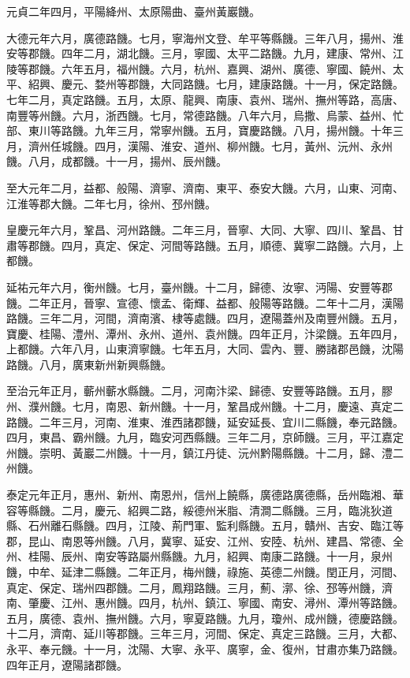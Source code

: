 \begin{pinyinscope}
 元貞二年四月，平陽絳州、太原陽曲、臺州黃巖饑。



 大德元年六月，廣德路饑。七月，寧海州文登、牟平等縣饑。三年八月，揚州、淮安等郡饑。四年二月，湖北饑。三月，寧國、太平二路饑。九月，建康、常州、江陵等郡饑。六年五月，福州饑。六月，杭州、嘉興、湖州、廣德、寧國、饒州、太平、紹興、慶元、婺州等郡饑，大同路饑。七月，建康路饑。十一月，保定路饑。七年二月，真定路饑。五月，太原、龍興、南康、袁州、瑞州、撫州等路，高唐、南豐等州饑。六月，浙西饑。七月，常德路饑。八年六月，烏撒、烏蒙、益州、忙部、東川等路饑。九年三月，常寧州饑。五月，寶慶路饑。八月，揚州饑。十年三月，濟州任城饑。四月，漢陽、淮安、道州、柳州饑。七月，黃州、沅州、永州饑。八月，成都饑。十一月，揚州、辰州饑。



 至大元年二月，益都、般陽、濟寧、濟南、東平、泰安大饑。六月，山東、河南、江淮等郡大饑。二年七月，徐州、邳州饑。



 皇慶元年六月，鞏昌、河州路饑。二年三月，晉寧、大同、大寧、四川、鞏昌、甘肅等郡饑。四月，真定、保定、河間等路饑。五月，順德、冀寧二路饑。六月，上都饑。



 延祐元年六月，衡州饑。七月，臺州饑。十二月，歸德、汝寧、沔陽、安豐等郡饑。二年正月，晉寧、宣德、懷孟、衛輝、益都、般陽等路饑。二年十二月，漢陽路饑。三年二月，河間，濟南濱、棣等處饑。四月，遼陽蓋州及南豐州饑。五月，寶慶、桂陽、澧州、潭州、永州、道州、袁州饑。四年正月，汴梁饑。五年四月，上都饑。六年八月，山東濟寧饑。七年五月，大同、雲內、豐、勝諸郡邑饑，沈陽路饑。八月，廣東新州新興縣饑。



 至治元年正月，蘄州蘄水縣饑。二月，河南汴梁、歸德、安豐等路饑。五月，膠州、濮州饑。七月，南恩、新州饑。十一月，鞏昌成州饑。十二月，慶遠、真定二路饑。二年三月，河南、淮東、淮西諸郡饑，延安延長、宜川二縣饑，奉元路饑。四月，東昌、霸州饑。九月，臨安河西縣饑。三年二月，京師饑。三月，平江嘉定州饑。崇明、黃巖二州饑。十一月，鎮江丹徒、沅州黔陽縣饑。十二月，歸、澧二州饑。



 泰定元年正月，惠州、新州、南恩州，信州上饒縣，廣德路廣德縣，岳州臨湘、華容等縣饑。二月，慶元、紹興二路，綏德州米脂、清澗二縣饑。三月，臨洮狄道縣、石州離石縣饑。四月，江陵、荊門軍、監利縣饑。五月，贛州、吉安、臨江等郡，昆山、南恩等州饑。八月，冀寧、延安、江州、安陸、杭州、建昌、常德、全州、桂陽、辰州、南安等路屬州縣饑。九月，紹興、南康二路饑。十一月，泉州饑，中牟、延津二縣饑。二年正月，梅州饑，祿施、英德二州饑。閏正月，河間、真定、保定、瑞州四郡饑。二月，鳳翔路饑。三月，薊、漷、徐、邳等州饑，濟南、肇慶、江州、惠州饑。四月，杭州、鎮江、寧國、南安、潯州、潭州等路饑。五月，廣德、袁州、撫州饑。六月，寧夏路饑。九月，瓊州、成州饑，德慶路饑。十二月，濟南、延川等郡饑。三年三月，河間、保定、真定三路饑。三月，大都、永平、奉元饑。十一月，沈陽、大寧、永平、廣寧，金、復州，甘肅亦集乃路饑。四年正月，遼陽諸郡饑。




\end{pinyinscope}
